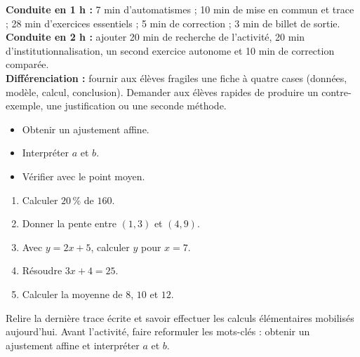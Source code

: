 \ifprof
\begin{methode}
\textbf{Conduite en 1 h :} 7 min d'automatismes ; 10 min de mise en commun et trace ; 28 min d'exercices essentiels ; 5 min de correction ; 3 min de billet de sortie.\\
\textbf{Conduite en 2 h :} ajouter 20 min de recherche de l'activité, 20 min d'institutionnalisation, un second exercice autonome et 10 min de correction comparée.\\
\textbf{Différenciation :} fournir aux élèves fragiles une fiche à quatre cases (données, modèle, calcul, conclusion). Demander aux élèves rapides de produire un contre-exemple, une justification ou une seconde méthode.
\end{methode}
\fi
{}
\begin{objectifs}\begin{itemize}\item Obtenir un ajustement affine.\item Interpréter $a$ et $b$.\item Vérifier avec le point moyen.\end{itemize}\end{objectifs}
\begin{automatismes}\begin{enumerate}\item Calculer $20\,\%$ de $160$. \item Donner la pente entre $(1,3)$ et $(4,9)$. \item Avec $y=2x+5$, calculer $y$ pour $x=7$. \item Résoudre $3x+4=25$. \item Calculer la moyenne de $8$, $10$ et $12$. \end{enumerate}\end{automatismes}
\begin{prerequis}Relire la dernière trace écrite et savoir effectuer les calculs élémentaires mobilisés aujourd'hui. Avant l'activité, faire reformuler les mots-clés : obtenir un ajustement affine et interpréter $a$ et $b$.\end{prerequis}

